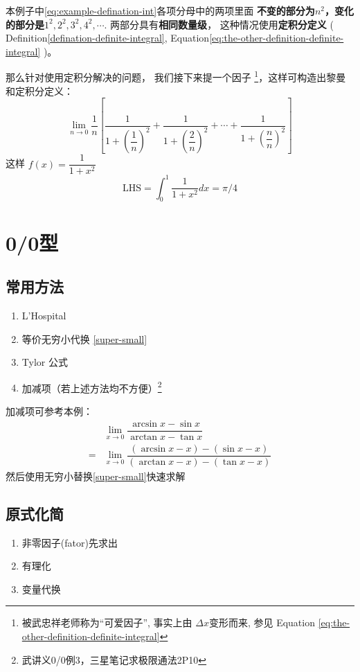 本例子中\ref{eq:example-defination-int}各项分母中的两项里面
\textbf{不变的部分为$n^2$，变化的部分是$1^2,2^2,3^2,4^2,\cdots$}.
两部分具有\textbf{相同数量级}，
这种情况使用\textbf{定积分定义}
(
    Definition\ref{defination-definite-integral}, 
    Equation\ref{eq:the-other-definition-definite-integral}
)。

那么针对使用定积分解决的问题，
我们接下来提一个因子
\footnote{
    被武忠祥老师称为“可爱因子”, 事实上由 
    $\Delta x$变形而来, 
    参见 Equation \ref{eq:the-other-definition-definite-integral}
}，这样可构造出黎曼和定积分定义：
\begin{equation*}
	\lim_{n \to 0} \dfrac{1}{n} \left[ 
	\dfrac{1}{1+\left(\dfrac{1}{n}\right)^2} + 
	\dfrac{1}{1+\left(\dfrac{2}{n}\right)^2} + \cdots + 
	\dfrac{1}{1+\left(\dfrac{n}{n}\right)^2}
	\right]  
\end{equation*}
这样 $f(x) = \dfrac{1}{1+x^2}$
\begin{equation*}
	\mbox{LHS} = \int_{0}^{1} \dfrac{1}{1+x^2} dx = \pi / 4
\end{equation*}

\section{0/0型}
\subsection{常用方法}
\begin{enumerate}
	\item L'Hospital
	\item 等价无穷小代换 \ref{super-small}
	\item Tylor 公式
	\item 加减项（若上述方法均不方便）\footnote{武讲义0/0例3，三星笔记求极限通法2P10}
\end{enumerate}

加减项可参考本例：
\begin{align*}
	&\lim_{x \to 0} \dfrac{\arcsin{x} - \sin{x}}{\arctan{x} - \tan{x}} \\
	= &\lim_{x \to 0} \dfrac{(\arcsin{x} -x) - (\sin{x}-x)}{(\arctan{x}-x) - (\tan{x}-x)}
\end{align*}
然后使用无穷小替换\ref{super-small}快速求解

\subsection{原式化简}
\begin{enumerate}
	\item 非零因子(fator)先求出 \label{non-zero-factor}
	\item 有理化
	\item 变量代换
\end{enumerate}

